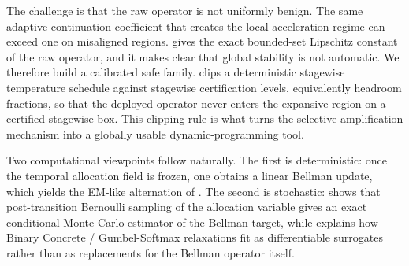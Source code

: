 \documentclass{article}
\theoremstyle{remark}
\begin{document}
The challenge is that the raw operator is not uniformly benign. The same adaptive continuation coefficient that creates the local acceleration regime can exceed one on misaligned regions.  gives the exact bounded-set Lipschitz constant of the raw operator, and it makes clear that global stability is not automatic. We therefore build a calibrated safe family.  clips a deterministic stagewise temperature schedule against stagewise certification levels, equivalently headroom fractions, so that the deployed operator never enters the expansive region on a certified stagewise box. This clipping rule is what turns the selective-amplification mechanism into a globally usable dynamic-programming tool.

Two computational viewpoints follow naturally. The first is deterministic: once the temporal allocation field is frozen, one obtains a linear Bellman update, which yields the EM-like alternation of . The second is stochastic:  shows that post-transition Bernoulli sampling of the allocation variable gives an exact conditional Monte Carlo estimator of the Bellman target, while  explains how Binary Concrete / Gumbel-Softmax relaxations fit as differentiable surrogates rather than as replacements for the Bellman operator itself.
\end{document}
